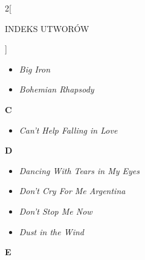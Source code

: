 \documentclass[a4paper]{report}
\begin{document}
\begin{multicols*}{2}[\begin{Huge}INDEKS UTWORÓW\end{Huge}\vspace{1cm}]
\begin{minipage}{\columnwidth}
\begin{itemize}[topsep=6pt, after=\vspace{5mm}, leftmargin=0mm]
		\item[]  \textit{Big Iron}  \\
		\item[]  \textit{Bohemian Rhapsody}  \\
	\end{itemize}
\end{minipage}
\begin{minipage}{\columnwidth}
\begin{Large}
		\textbf{C}
	\end{Large} 
	\begin{itemize}[topsep=6pt, after=\vspace{5mm}, leftmargin=0mm]
		\itemsep0em
		\item[]\textit{Can't Help Falling in Love}  \\
	\end{itemize}
\end{minipage}
\begin{minipage}{\columnwidth}
\begin{Large}
		\textbf{D}
	\end{Large} 
	\begin{itemize}[topsep=6pt, after=\vspace{1.5mm}, leftmargin=0mm]
		\itemsep0em
		\item[]\textit{Dancing With Tears in My Eyes}  \\
		\item[]  \textit{Don't Cry For Me Argentina}  \\
	\end{itemize}
\end{minipage}
\begin{minipage}{\columnwidth}
	\begin{itemize}[topsep=6pt, after=\vspace{5mm}, leftmargin=0mm]
		\itemsep0em
		\item[]  \textit{Don't Stop Me Now}  \\
		\item[]  \textit{Dust in the Wind}  \\
	\end{itemize}
\end{minipage}
\begin{minipage}{\columnwidth}
\begin{Large}
		\textbf{E}
	\end{Large} 
	\begin{itemize}[topsep=6pt, after=\vspace{5mm}, leftmargin=0mm]

\end{itemize}
\end{minipage}
\end{multicols*}
\end{document}
